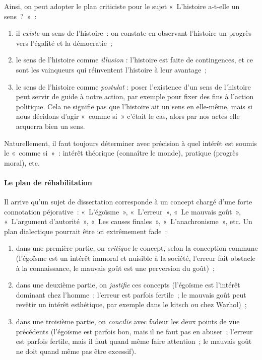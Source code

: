 \documentclass[a4paper,12pt]{article}
\begin{document}
Ainsi, on peut adopter le plan criticiste pour le sujet « L'histoire
a-t-elle un sens ? » :

\begin{enumerate}
\item il \emph{existe} un sens de l'histoire : on constate en observant
l'histoire un progrès vers l'égalité et la démocratie ;

\item le sens de l'histoire comme \emph{illusion} : l'histoire est faite de
contingences, et ce sont les vainqueurs qui réinventent l'histoire à
leur avantage ;

\item le sens de l'histoire comme \emph{postulat} : poser l'existence d'un sens
de l'histoire peut servir de guide à notre action, par exemple pour
fixer des fins à l'action politique. Cela ne signifie pas que
l'histoire ait un sens en elle-même, mais si nous décidons d'agir
« comme si » c'était le cas, alors par nos actes elle acquerra bien un
sens.
\end{enumerate}

Naturellement, il faut toujours déterminer avec précision à quel intérêt
est soumis le « comme si » : intérêt théorique (connaître le monde),
pratique (progrès moral), etc.

\paragraph{Le plan de réhabilitation}
\label{sec-3-1-4-4}

Il arrive qu'un sujet de dissertation corresponde à un concept chargé
d'une forte connotation péjorative : « L'égoïsme », « L'erreur », « Le
mauvais goût », « L'argument d'autorité », « Les causes finales »,
« L'anachronisme », etc. Un plan dialectique pourrait être ici extrêmement
fade :

\begin{enumerate}
\item dans une première partie, on \emph{critique} le concept, selon la
conception commune (l'égoïsme est un intérêt immoral et nuisible à la
société, l'erreur fait obstacle à la connaissance, le mauvais goût
est une perversion du goût) ;

\item dans une deuxième partie, on \emph{justifie} ces concepts (l'égoïsme est
l'intérêt dominant chez l'homme ; l'erreur est parfois fertile ; le
mauvais goût peut revêtir un intérêt esthétique, par exemple dans le
kitsch ou chez Warhol) ;

\item dans une troisième partie, on \emph{concilie} avec fadeur les deux points
de vue précédents (l'égoïsme est parfois bon, mais il ne faut pas en
abuser ; l'erreur est parfois fertile, mais il faut quand même faire
attention ; le mauvais goût ne doit quand même pas être excessif).
\end{enumerate}
\end{document}
